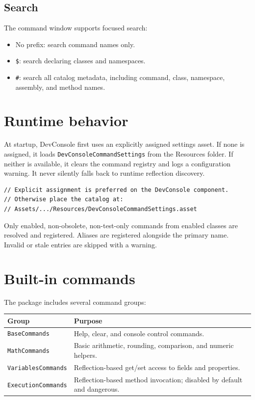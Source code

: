 \documentclass[11pt,a4paper]{article}
\begin{document}
\subsection{Search}

The command window supports focused search:

\begin{itemize}[leftmargin=*]
  \item No prefix: search command names only.
  \item \texttt{\$}: search declaring classes and namespaces.
  \item \texttt{\#}: search all catalog metadata, including command, class, namespace, assembly, and method names.
\end{itemize}

\section{Runtime behavior}

At startup, DevConsole first uses an explicitly assigned settings asset. If none is assigned, it loads \texttt{DevConsoleCommandSettings} from the Resources folder. If neither is available, it clears the command registry and logs a configuration warning. It never silently falls back to runtime reflection discovery.

\begin{lstlisting}[style=csharp]
// Explicit assignment is preferred on the DevConsole component.
// Otherwise place the catalog at:
// Assets/.../Resources/DevConsoleCommandSettings.asset
\end{lstlisting}

Only enabled, non-obsolete, non-test-only commands from enabled classes are resolved and registered. Aliases are registered alongside the primary name. Invalid or stale entries are skipped with a warning.

\section{Built-in commands}

The package includes several command groups:

\begin{longtable}{p{}p{}}
\toprule
\textbf{Group} & \textbf{Purpose} \\
\midrule
\texttt{BaseCommands} & Help, clear, and console control commands. \\
\texttt{MathCommands} & Basic arithmetic, rounding, comparison, and numeric helpers. \\
\texttt{VariablesCommands} & Reflection-based get/set access to fields and properties. \\
\texttt{ExecutionCommands} & Reflection-based method invocation; disabled by default and dangerous. \\
\bottomrule
\end{longtable}
\end{document}
